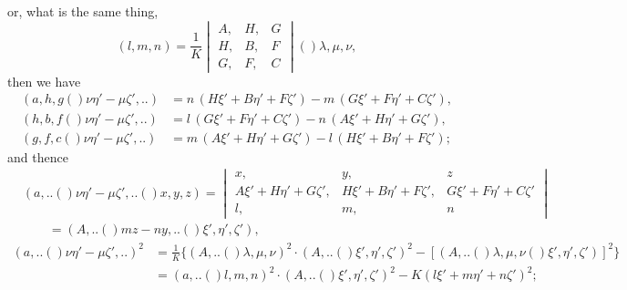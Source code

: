 \documentclass[11pt,a4paper]{book}
\providecommand{\qform}[1]{(#1)}
\begin{document}
or, what is the same thing,
\[
(l, m, n) = \frac{1}{K}
\begin{vmatrix}
A, & H, & G \\
H, & B, & F \\
G, & F, & C
\end{vmatrix}
\!\qform{}{\lambda, \mu, \nu},
\]
then we have
\begin{align*}
(a, h, g \!\qform{}{\nu\eta' - \mu\zeta',..}) &= n\,(H\xi' + B\eta' + F\zeta') - m\,(G\xi' + F\eta' + C\zeta'),\\
(h, b, f \!\qform{}{\nu\eta' - \mu\zeta',..}) &= l\,(G\xi' + F\eta' + C\zeta') - n\,(A\xi' + H\eta' + G\zeta'),\\
(g, f, c \!\qform{}{\nu\eta' - \mu\zeta',..}) &= m\,(A\xi' + H\eta' + G\zeta') - l\,(H\xi' + B\eta' + F\zeta');
\end{align*}
and thence
\begin{align*}
&(a,..\!\qform{}{\nu\eta' - \mu\zeta',..}\!\qform{}{x, y, z}) =
\begin{vmatrix}
x, & y, & z \\
A\xi' + H\eta' + G\zeta', & H\xi' + B\eta' + F\zeta', & G\xi' + F\eta' + C\zeta' \\
l, & m, & n
\end{vmatrix}\\
&\qquad = (A,..\!\qform{}{mz - ny,..}\!\qform{}{\xi', \eta', \zeta'}),
\end{align*}
\begin{align*}
(a,..\!\qform{}{\nu\eta' - \mu\zeta',..})^{2}
&= \frac{1}{K}\Big\{(A,..\!\qform{}{\lambda, \mu, \nu})^{2} \cdot (A,..\!\qform{}{\xi', \eta', \zeta'})^{2}
- [(A,..\!\qform{}{\lambda, \mu, \nu}\!\qform{}{\xi', \eta', \zeta'})]^{2}\Big\}\\
&= (a,..\!\qform{}{l, m, n})^{2} \cdot (A,..\!\qform{}{\xi', \eta', \zeta'})^{2} - K(l\xi' + m\eta' + n\zeta')^{2};
\end{align*}
\end{document}
